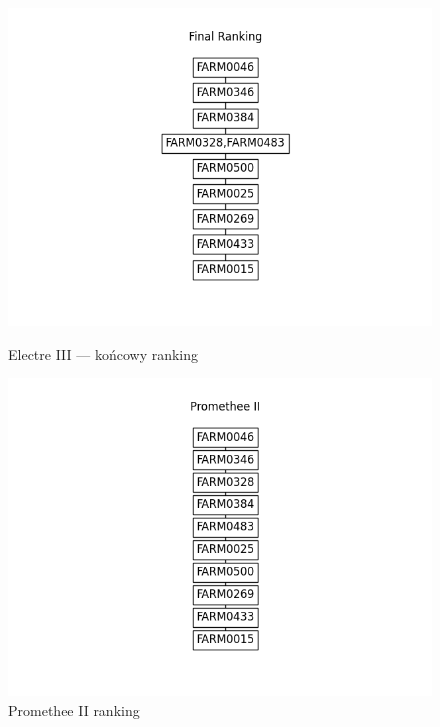\documentclass[11pt]{article}
\begin{document}
\begin{figure}[H]
\centering
\begin{minipage}[b]{0.49\linewidth}
  \centering
  \includegraphics[width=\linewidth]{output/Final Ranking.png}
  \caption{Electre III --- końcowy ranking}
  \label{fig:electre-final}
\end{minipage}
\hfill
\begin{minipage}[b]{0.49\linewidth}
  \centering
  \includegraphics[width=\linewidth]{output/Promethee II.png}
  \caption{Promethee II ranking}
  \label{fig:promethee}
\end{minipage}
\end{figure}
\end{document}
